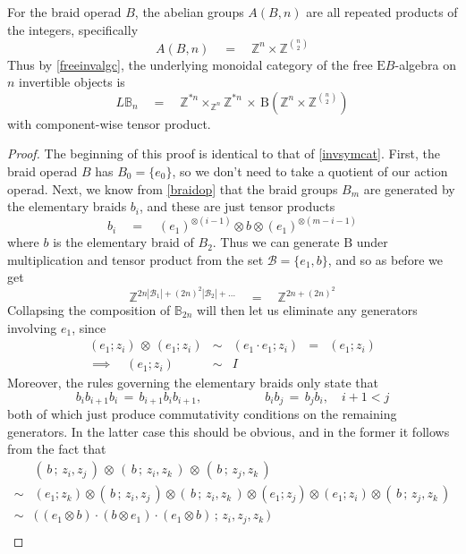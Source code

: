 \documentclass{amsbook} %
\numberwithin{section}{chapter}
\begin{document}
\begin{prop} \label{invbraidcat} For the braid operad $B$, the abelian groups $A(B,n)$ are all repeated products of the integers, specifically
\[ A(B,n) \quad = \quad \mathbb{Z}^{n} \times \mathbb{Z}^{{n}\choose{2}} \]
Thus by \cref{freeinvalgc}, the underlying monoidal category of the free $\mathrm{E}B$-algebra on $n$ invertible objects is
\[ L\mathbb{B}_n \quad = \quad \mathbb{Z}^{\ast n} \times_{\mathbb{Z}^n} \mathbb{Z}^{\ast n}  \, \times \, \mathrm{B}(\mathbb{Z}^{n} \times \mathbb{Z}^{{n}\choose{2}} ) \]
with component-wise tensor product.
\end{prop}
\begin{proof}
The beginning of this proof is identical to that of \cref{invsymcat}. First, the braid operad $B$ has $B_0 = \{e_0\}$, so we don't need to take a quotient of our action operad. Next, we know from \cref{braidop} that the braid groups $B_m$ are generated by the elementary braids $b_i$, and these are just tensor products
\[ b_i \quad = \quad (e_1)^{\otimes (i-1)} \otimes b \otimes (e_1)^{\otimes (m-i-1)} \]
where $b$ is the elementary braid of $B_2$. Thus we can generate $\mathrm{B}$ under multiplication and tensor product from the set $\mathcal{B} = \{ e_1, b \}$, and so as before we get
\[ \mathbb{Z}^{2n|\mathcal{B}_1| + (2n)^2|\mathcal{B}_2| + \ldots}  \quad = \quad \mathbb{Z}^{2n + (2n)^2} \]
Collapsing the composition of $\mathbb{B}_{2n}$ will then let us eliminate any generators involving $e_1$, since
\[ \begin{array}{rllll}
			(e_1; z_i) \, \otimes \, (e_1; z_i) & \sim & (e_1 \cdot e_1; z_i) & = & (e_1; z_i) \\
			\implies \quad (e_1; z_i) & \sim & I
		\end{array}
\]
Moreover, the rules governing the elementary braids only state that
\[ b_i b_{i+1} b_i \, = \, b_{i+1} b_i b_{i+1}, \quad \quad \quad \quad \quad b_i b_j \, = \, b_j b_i, \quad i+1 < j \]
both of which just produce commutativity conditions on the remaining generators. In the latter case this should be obvious, and in the former it follows from the fact that
\[ \begin{array}{rl}
			& ( \, b \, ; \, z_i, z_j \, ) \, \otimes \, ( \, b \, ; \, z_i, z_k \, ) \, \otimes \, ( \, b \, ; \, z_j, z_k \, ) \\
			\sim & (e_1; z_k) \otimes ( \, b \, ; \, z_i, z_j \, ) \otimes ( \, b \, ; \, z_i, z_k \, ) \otimes (e_1; z_j) \otimes (e_1; z_i) \otimes ( \, b \, ; \, z_j, z_k \, )\\
			\sim & \big( \, (e_1 \otimes b) \cdot (b \otimes e_1) \cdot (e_1 \otimes b) \, ; \, z_i, z_j, z_k \, \big) \\	

\end{array}\]
\end{proof}
\end{document}
